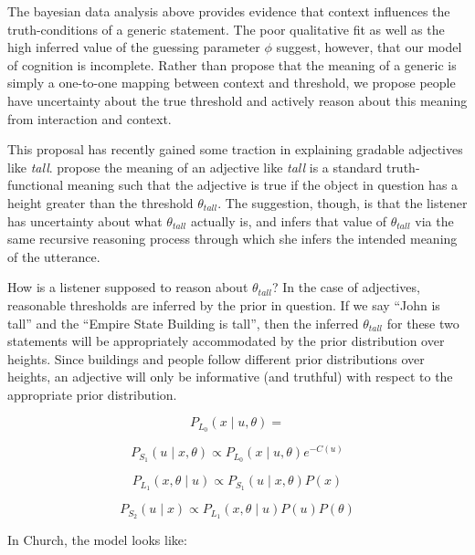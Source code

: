 \documentclass[10pt,letterpaper]{article}
\begin{document}

The bayesian data analysis above provides evidence that context influences the truth-conditions of a generic statement. The poor qualitative fit as well as the high inferred value of the guessing parameter $\phi$ suggest, however, that our model of cognition is incomplete. Rather than propose that the meaning of a generic is simply a one-to-one mapping between context and threshold, we propose people have uncertainty about the true threshold and actively reason about this meaning from interaction and context. 

This proposal has recently gained some traction in explaining gradable adjectives like \emph{tall}.   propose the meaning of an adjective like \emph{tall} is a standard truth-functional meaning such that the adjective is true if the object in question has a height greater than the threshold $\theta_{tall}$. The suggestion, though, is that the listener has uncertainty about what $\theta_{tall}$ actually is, and infers that value of $\theta_{tall}$ via the same recursive reasoning process through which she infers the intended meaning of the utterance.

How is a listener supposed to reason about $\theta_{tall}$? In the case of adjectives, reasonable thresholds are inferred by the prior in question. If we say ``John is tall'' and the ``Empire State Building is tall'', then the inferred $\theta_{tall}$ for these two statements will be appropriately accommodated by the prior distribution over heights. Since buildings and people follow different prior distributions over heights, an adjective will only be informative (and truthful) with respect to the appropriate prior distribution. 


$$ P_{L_{0}}(x \mid u, \theta)= $$

$$ P_{S_{1}}(u \mid x, \theta) \propto P_{L_{0}}(x \mid u, \theta) e^{-C(u)} $$

$$ P_{L_{1}}(x , \theta \mid u) \propto P_{S_{1}}(u \mid x, \theta) P(x) $$

$$ P_{S_{2}}(u \mid x) \propto P_{L_{1}}(x , \theta \mid u) P(u) P(\theta) $$


In Church, the model looks like:
\end{document}
